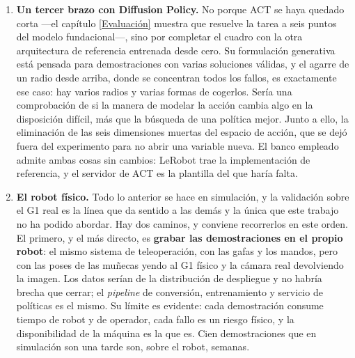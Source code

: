 \begin{enumerate}
	\item \textbf{Un tercer brazo con Diffusion Policy.} No porque ACT se haya quedado corta —el
	capítulo \ref{Evaluación} muestra que resuelve la tarea a seis puntos del modelo fundacional—,
	sino por completar el cuadro con la otra arquitectura de referencia entrenada desde cero. Su
	formulación generativa está pensada para demostraciones con varias soluciones válidas, y el
	agarre de un radio desde arriba, donde se concentran todos los fallos, es exactamente ese
	caso: hay varios radios y varias formas de cogerlos. Sería una comprobación de si la manera de
	modelar la acción cambia algo en la disposición difícil, más que la búsqueda de una política
	mejor. Junto a ello, la eliminación de las seis dimensiones muertas del espacio de acción, que
	se dejó fuera del experimento para no abrir una variable nueva. El banco empleado admite ambas
	cosas sin cambios: LeRobot trae la implementación de referencia, y el servidor de ACT es la
	plantilla del que haría falta.

	\item \textbf{El robot físico.} Todo lo anterior se hace en simulación, y la validación sobre
	el G1 real es la línea que da sentido a las demás y la única que este trabajo no ha podido
	abordar. Hay dos caminos, y conviene recorrerlos en este orden. El primero, y el más directo, es
	\textbf{grabar las demostraciones en el propio robot}: el mismo sistema de teleoperación, con las
	gafas y los mandos, pero con las poses de las muñecas yendo al G1 físico y la cámara real
	devolviendo la imagen. Los datos serían de la distribución de despliegue y no habría brecha
	que cerrar; el \textit{pipeline} de conversión, entrenamiento y servicio de políticas es el
	mismo. Su límite es evidente: cada demostración consume tiempo de robot y de operador, cada
	fallo es un riesgo físico, y la disponibilidad de la máquina es la que es. Cien demostraciones
	que en simulación son una tarde son, sobre el robot, semanas.


\end{enumerate}
